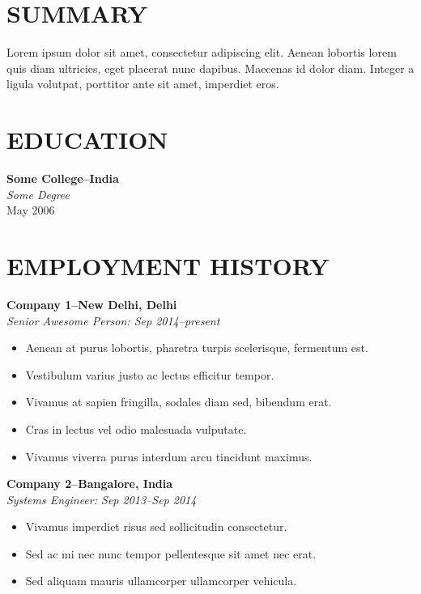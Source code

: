 \documentclass{res}
\begin{document}
\thispagestyle{empty} %
\address{\#11 Example St\\
Sample Nagar\\
New Delhi, Delhi 110001\\
+91 123 456 7890\\}

\begin{resume}
\vspace{0.1in}

\section{SUMMARY}
Lorem ipsum dolor sit amet, consectetur adipiscing elit. Aenean lobortis lorem quis diam ultricies, eget placerat nunc dapibus. Maecenas id dolor diam. Integer a ligula volutpat, porttitor ante sit amet, imperdiet eros.

\section{EDUCATION}
\vspace{0.1in}

    {\bf Some College--India} \\
        \textit{Some Degree} \\
        May 2006

\section{EMPLOYMENT HISTORY}
\vspace{0.1in}
    {\bf Company 1--New Delhi, Delhi} \\
    {\it Senior Awesome Person: Sep 2014--present}
        \begin{itemize}
            \item[] Aenean at purus lobortis, pharetra turpis scelerisque, fermentum est.
            \item[] Vestibulum varius justo ac lectus efficitur tempor.
            \item[] Vivamus at sapien fringilla, sodales diam sed, bibendum erat.
            \item[] Cras in lectus vel odio malesuada vulputate.
            \item[] Vivamus viverra purus interdum arcu tincidunt maximus.
        \end{itemize}

    {\bf Company 2--Bangalore, India} \\
    {\it Systems Engineer: Sep 2013--Sep 2014}
        \begin{itemize}
            \item[] Vivamus imperdiet risus sed sollicitudin consectetur.
            \item[] Sed ac mi nec nunc tempor pellentesque sit amet nec erat.
            \item[] Sed aliquam mauris ullamcorper ullamcorper vehicula.
       \end{itemize}


\end{resume}
\end{document}
